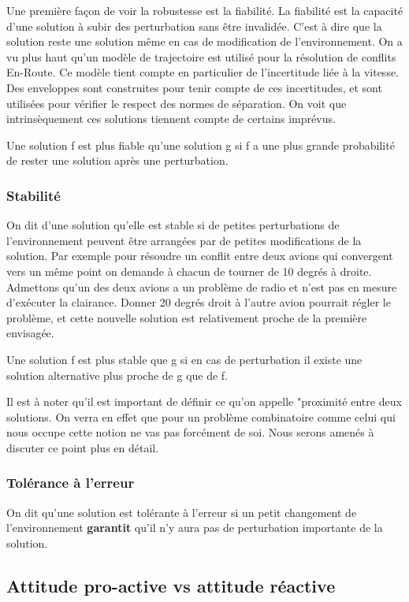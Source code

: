 Une première façon de voir la robustesse est la fiabilité. La fiabilité est la capacité d'une solution à subir des perturbation sans être invalidée. C'est à dire que la solution reste une solution même en cas de modification de l'environnement. On a vu plus haut qu'un modèle de trajectoire est utilisé pour la résolution de conflits En-Route. Ce modèle tient compte en particulier de l'incertitude liée à la vitesse. Des enveloppes sont construites pour tenir compte de ces incertitudes, et sont utilisées pour vérifier le respect des normes de séparation. On voit que intrinsèquement ces solutions tiennent compte de certains imprévus. \\

\begin{definition}
	
	Une solution f est plus fiable qu'une solution g si f a une plus grande probabilité de rester une 			solution après une perturbation.
	
\end{definition}

	
\subsubsection*{Stabilité}
On dit d'une solution qu'elle est stable si de petites perturbations de l'environnement peuvent être arrangées par de petites modifications de la solution. Par exemple pour résoudre un conflit entre deux avions qui convergent vers un même point on demande à chacun de tourner de 10 degrés à droite. Admettons qu'un des deux avions a un problème de radio et n'est pas en mesure d'exécuter la clairance. Donner 20 degrés droit à l'autre avion pourrait régler le problème, et cette nouvelle solution est relativement proche de la première envisagée.
\begin{definition}
Une solution f est plus stable que g si en cas de perturbation il existe une solution alternative plus proche de g que de f.
\end{definition}

Il est à noter qu'il est important de définir ce qu'on appelle "proximité entre deux solutions. On verra en effet que pour un problème combinatoire comme celui qui nous occupe cette notion ne  vas pas forcément de soi. Nous serons amenés à discuter ce point plus en détail.
\subsubsection*{Tolérance à l'erreur}
On dit qu'une solution est tolérante à l'erreur si un petit changement de l'environnement \textbf{garantit} qu'il n'y aura pas de perturbation importante de la solution.


\subsection{Attitude pro-active vs attitude réactive}


